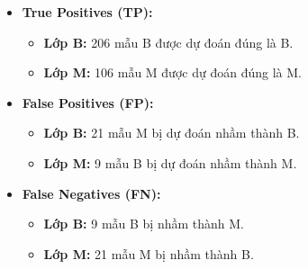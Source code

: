 \begin{itemize}
	\item \textbf{True Positives (TP):}
	\begin{itemize}
		\item \textbf{Lớp B:} 206 mẫu B được dự đoán đúng là B.
		\item \textbf{Lớp M:} 106 mẫu M được dự đoán đúng là M.
	\end{itemize}
	
	\item \textbf{False Positives (FP):}
	\begin{itemize}
		\item \textbf{Lớp B:} 21 mẫu M bị dự đoán nhầm thành B.
		\item \textbf{Lớp M:} 9 mẫu B bị dự đoán nhầm thành M.
	\end{itemize}
	
	\item \textbf{False Negatives (FN):}
	\begin{itemize}
		\item \textbf{Lớp B:} 9 mẫu B bị nhầm thành M.
		\item \textbf{Lớp M:} 21 mẫu M bị nhầm thành B.
	\end{itemize}
\end{itemize}

